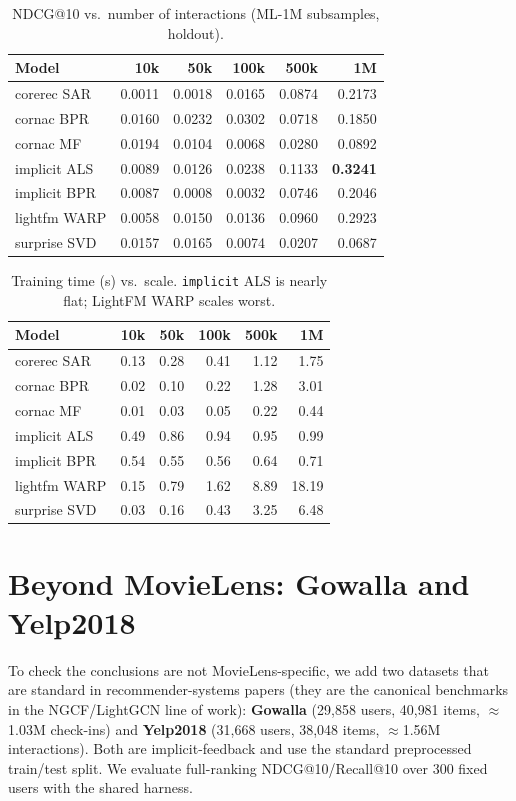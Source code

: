 \documentclass[10pt]{article}
\begin{document}
\begin{table}[h]\centering\small
\begin{tabular}{lrrrrr}
\toprule
Model & 10k & 50k & 100k & 500k & 1M \\
\midrule
corerec SAR   & 0.0011 & 0.0018 & 0.0165 & 0.0874 & 0.2173 \\
cornac BPR    & 0.0160 & 0.0232 & 0.0302 & 0.0718 & 0.1850 \\
cornac MF     & 0.0194 & 0.0104 & 0.0068 & 0.0280 & 0.0892 \\
implicit ALS  & 0.0089 & 0.0126 & 0.0238 & 0.1133 & \textbf{0.3241} \\
implicit BPR  & 0.0087 & 0.0008 & 0.0032 & 0.0746 & 0.2046 \\
lightfm WARP  & 0.0058 & 0.0150 & 0.0136 & 0.0960 & 0.2923 \\
surprise SVD  & 0.0157 & 0.0165 & 0.0074 & 0.0207 & 0.0687 \\
\bottomrule
\end{tabular}
\caption{NDCG@10 vs.\ number of interactions (ML-1M subsamples, holdout).}
\label{tab:scale-ndcg}
\end{table}

\begin{table}[h]\centering\small
\begin{tabular}{lrrrrr}
\toprule
Model & 10k & 50k & 100k & 500k & 1M \\
\midrule
corerec SAR   & 0.13 & 0.28 & 0.41 & 1.12 & 1.75 \\
cornac BPR    & 0.02 & 0.10 & 0.22 & 1.28 & 3.01 \\
cornac MF     & 0.01 & 0.03 & 0.05 & 0.22 & 0.44 \\
implicit ALS  & 0.49 & 0.86 & 0.94 & 0.95 & 0.99 \\
implicit BPR  & 0.54 & 0.55 & 0.56 & 0.64 & 0.71 \\
lightfm WARP  & 0.15 & 0.79 & 1.62 & 8.89 & 18.19 \\
surprise SVD  & 0.03 & 0.16 & 0.43 & 3.25 & 6.48 \\
\bottomrule
\end{tabular}
\caption{Training time (s) vs.\ scale. \texttt{implicit} ALS is nearly flat;
LightFM WARP scales worst.}
\label{tab:scale-cost}
\end{table}

\section{Beyond MovieLens: Gowalla and Yelp2018}
\label{sec:datasets}
To check the conclusions are not MovieLens-specific, we add two datasets that are
standard in recommender-systems papers (they are the canonical benchmarks in the
NGCF/LightGCN line of work): \textbf{Gowalla} (29{,}858 users, 40{,}981 items,
$\approx$1.03M check-ins) and \textbf{Yelp2018} (31{,}668 users, 38{,}048 items,
$\approx$1.56M interactions). Both are implicit-feedback and use the standard
preprocessed train/test split. We evaluate full-ranking NDCG@10/Recall@10 over 300
fixed users with the shared harness.
\end{document}
